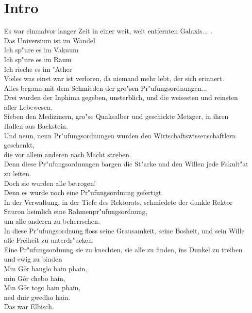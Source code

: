 %
%
\newpage
\section{Intro}
  \label{Intro}
    \sound{}
    \licht{}
    \requisiten{}
Es war einmalvor langer Zeit in einer weit, weit entfernten Galaxis... .\\
Das Universium ist im Wandel\\
Ich sp"ure es im Vakuum \\
Ich sp"ure es im Raum\\
Ich rieche es im "Ather\\
Vieles was einst war ist verloren, da niemand mehr lebt, der sich erinnert.\\
Alles begann mit dem Schmieden der gro"sen Pr"ufungsordnungen...\\
Drei wurden der Inphima gegeben, unsterblich, und die weisesten und reinsten aller Lebewesen.\\
Sieben den Medizinern, gro"se Quaksalber und geschickte Metzger, in ihren Hallen aus Backstein.\\
Und neun, neun Pr"ufungsordnungen wurden den Wirtschaftswissenschaftlern geschenkt,\\
die vor allem anderen nach Macht streben.\\
Denn diese Pr"ufungsordnungen bargen die St"arke und den Willen jede Fakult"at zu leiten.\\
Doch sie wurden alle betrogen!\\
Denn es wurde noch eine Pr"ufungsordnung gefertigt\\
In der Verwaltung, in der Tiefe des Rektorats, schmiedete der dunkle Rektor Sauron heimlich eine Rahmenpr"ufungsordnung,\\
um alle anderen zu beherrschen.\\
In diese Pr"ufungsordnung floss seine Grausamkeit, seine Bosheit, und sein Wille alle Freiheit zu unterdr"ucken.\\
Eine Pr"ufungsordnung sie zu knechten,
sie alle zu finden, 
ins Dunkel zu treiben 
und ewig zu binden\\
Min G$\hat{o}$r bauglo hain phain, \\
min G$\hat{o}$r chebo hain, \\
Min G$\hat{o}$r togo hain phain, \\
ned duir gwedho hain.\\
 Das war Elbisch.\\
%
